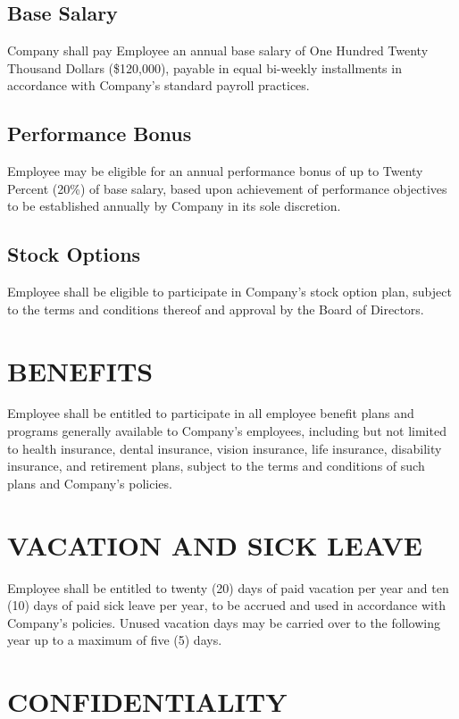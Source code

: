 \documentclass[12pt,letterpaper]{article}
\begin{document}
\subsection{Base Salary}
Company shall pay Employee an annual base salary of One Hundred Twenty Thousand Dollars (\$120,000), payable in equal bi-weekly installments in accordance with Company's standard payroll practices.

\subsection{Performance Bonus}
Employee may be eligible for an annual performance bonus of up to Twenty Percent (20\%) of base salary, based upon achievement of performance objectives to be established annually by Company in its sole discretion.

\subsection{Stock Options}
Employee shall be eligible to participate in Company's stock option plan, subject to the terms and conditions thereof and approval by the Board of Directors.

\section{BENEFITS}

Employee shall be entitled to participate in all employee benefit plans and programs generally available to Company's employees, including but not limited to health insurance, dental insurance, vision insurance, life insurance, disability insurance, and retirement plans, subject to the terms and conditions of such plans and Company's policies.

\section{VACATION AND SICK LEAVE}

Employee shall be entitled to twenty (20) days of paid vacation per year and ten (10) days of paid sick leave per year, to be accrued and used in accordance with Company's policies. Unused vacation days may be carried over to the following year up to a maximum of five (5) days.

\section{CONFIDENTIALITY}
\end{document}
